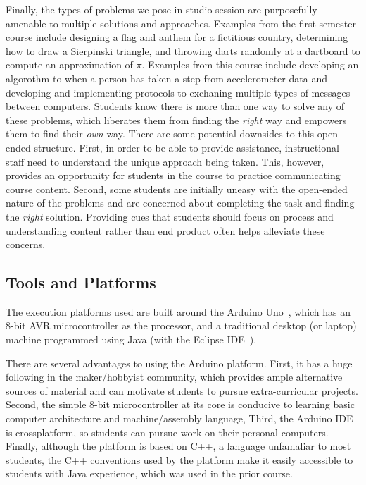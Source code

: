 
Finally, the types of problems we pose in studio session are purposefully amenable to multiple solutions and approaches.  Examples from the first semester course include designing a flag and anthem for a fictitious country, determining how to draw a Sierpinski triangle, and throwing darts randomly at a dartboard to compute an approximation of $\pi$. Examples from this course include developing an algorothm to when a person has taken a step from accelerometer data and developing and implementing protocols to exchaning multiple types of messages between computers. Students know there is more than one way to solve any of these problems, which liberates them from finding the \emph{right} way and empowers them to find their \emph{own} way.  There are some potential downsides to this open ended structure.  First, in order to be able to provide assistance, instructional staff need to understand the unique approach being taken.  This, however, provides an opportunity for students in the course to practice communicating course content.   Second, some students are initially uneasy with the open-ended nature of the problems and are concerned about completing the task and finding the \emph{right} solution.  Providing cues that students should focus on process and understanding content rather than end product often helps alleviate these concerns.


\subsection{Tools and Platforms}

The execution platforms used are built around the Arduino Uno~\cite{arduino}, which has an 8-bit AVR microcontroller as the processor, and a traditional desktop (or laptop) machine programmed using Java (with the Eclipse IDE~\cite{eclipse}).

There are several advantages to using the Arduino platform.  First, it has a huge following in the maker/hobbyist community, which provides ample alternative sources of material and can motivate students to pursue extra-curricular projects.  Second, the simple 8-bit microcontroller at its core is conducive to learning basic computer architecture and machine/assembly language, Third, the Arduino IDE is crossplatform, so students can pursue work on their personal computers. Finally, although the platform is based on C++, a language unfamaliar to most students, the C++ conventions used by the platform make it easily accessible to students with Java experience, which was used in the prior course.

